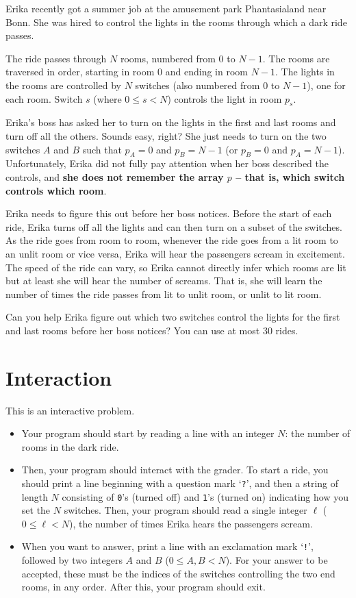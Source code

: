 
Erika recently got a summer job at the amusement park Phantasialand near Bonn.
She was hired to control the lights in the rooms through which a dark ride passes.

The ride passes through $N$ rooms, numbered from $0$ to $N-1$. The rooms are traversed in order, starting in room $0$ and ending in room $N-1$. The lights in the rooms are controlled by $N$ switches (also numbered from $0$ to $N-1$), one for each room. Switch $s$ (where $0\le s < N$) controls the light in room $p_{s}$.

Erika's boss has asked her to turn on the lights in the first and last rooms and turn off all the others. Sounds easy, right? She just needs to turn on the two switches $A$ and $B$ such that $p_{A} = 0$ and $p_{B} = N-1$ (or $p_{B} = 0$ and $p_{A} = N-1$). Unfortunately, Erika did not fully pay attention when her boss described the controls, and \textbf{she does not remember the array $p$ -- that is, which switch controls which room}.

Erika needs to figure this out before her boss notices.
Before the start of each ride, Erika turns off all the lights and can then turn on a subset of the switches. As the ride goes from room to room, whenever the ride goes from a lit room to an unlit room or vice versa, Erika will hear the passengers scream in excitement. The speed of the ride can vary, so Erika cannot directly infer which rooms are lit but at least she will hear the number of screams. That is, she will learn the number of times the ride passes from lit to unlit room, or unlit to lit room.

Can you help Erika figure out which two switches control the lights for the first and last rooms before her boss notices?  You can use at most $30$ rides.

\section*{Interaction}
This is an interactive problem.

\begin{itemize}

  \item
Your program should start by reading a line with an integer $N$: the number of rooms in the dark ride.

  \item
Then, your program should interact with the grader.
    To start a ride, you should print a line beginning with a question mark `\verb!?!', and then a string of length $N$ consisting of \verb!0!'s (turned off) and \verb!1!’s (turned on) indicating how you set the $N$ switches.
Then, your program should read a single integer $\ell$ ($0 \leq \ell < N$), the number of times Erika hears the passengers scream.

  \item
    When you want to answer, print a line with an exclamation mark `\verb|!|', followed by two integers $A$ and $B$ ($0\le A,B < N$). For your answer to be accepted, these must be the indices of the switches controlling the two end rooms, in any order.
After this, your program should exit.
\end{itemize}

